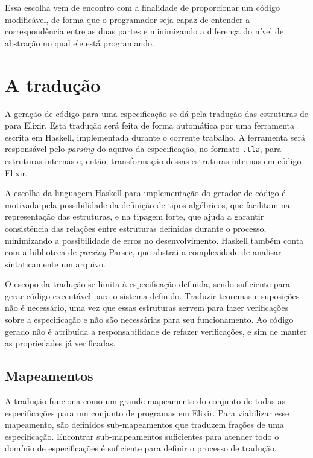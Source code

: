 Essa escolha vem de encontro com a finalidade de proporcionar um código modificável, de forma que o programador seja capaz de entender a correspondência entre as duas partes e minimizando a diferença do nível de abstração no qual ele está programando.

\section{A tradução}
\label{traducao}

A geração de código para uma especificação se dá pela tradução das estruturas de \TLA para Elixir. Esta tradução será feita de forma automática por uma ferramenta escrita em Haskell, implementada durante o corrente trabalho. A ferramenta será responsável pelo \textit{parsing} do aquivo da especificação, no formato \texttt{.tla}, para estruturas internas e, então, transformação dessas estruturas internas em código Elixir.

A escolha da linguagem Haskell para implementação do gerador de código é motivada pela possibilidade da definição de tipos algébricos, que facilitam na representação das estruturas, e na tipagem forte, que ajuda a garantir consistência das relações entre estruturas definidas durante o processo, minimizando a possibilidade de erros no desenvolvimento. Haskell também conta com a biblioteca de \textit{parsing} Parsec, que abstrai a complexidade de analisar sintaticamente um arquivo.

O escopo da tradução se limita à especificação definida, sendo suficiente para gerar código executável para o sistema definido. Traduzir teoremas e suposições não é necessário, uma vez que essas estruturas servem para fazer verificações sobre a especificação e não são necessárias para seu funcionamento. Ao código gerado não é atribuída a responsabilidade de refazer verificações, e sim de manter as propriedades já verificadas.

\subsection{Mapeamentos}
\label{mapeamentos}

A tradução funciona como um grande mapeamento do conjunto de todas as especificações para um conjunto de programas em Elixir. Para viabilizar esse mapeamento, são definidos sub-mapeamentos que traduzem frações de uma especificação. Encontrar sub-mapeamentos suficientes para atender todo o domínio de especificações é suficiente para definir o processo de tradução.

